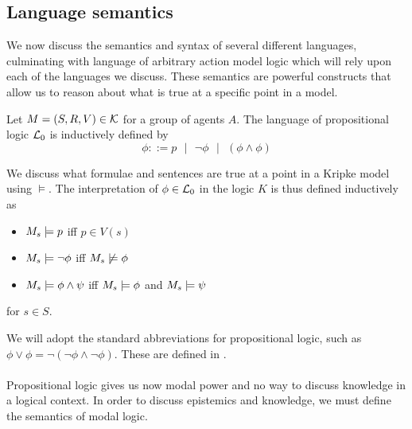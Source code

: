 \subsection{Language semantics}
We now discuss the semantics and syntax of several different languages, culminating with language of
arbitrary action model logic which will rely upon each of the languages we discuss.
These semantics are powerful constructs that allow us to reason about what is true at a specific
point in a model.

\begin{defn} \label{propLogic}
Let $M = (S, R, V) \in \mathcal{K}$ for a group of agents $A$.
The language of propositional logic $\mathcal{L}_0$ is inductively defined by
\[
	\phi ::= p \text{ } | \text{ } \neg \phi \text{ } | \text{ } (\phi \land \phi)
\]

We discuss what formulae and sentences are true at a point in a Kripke model using $\models$.
The interpretation of $\phi \in \mathcal{L}_0$ in the logic $K$ is thus defined inductively as

\begin{itemize}
	\item $M_s \models p$ iff $p \in V(s)$
	\item $M_s \models \neg \phi$ iff $M_s \not \models \phi$
	\item $M_s \models \phi \land \psi$ iff $M_s \models \phi$ and $M_s \models \psi$
\end{itemize}

for $s \in S$.
\end{defn}

We will adopt the standard abbreviations for propositional logic, such as $\phi \lor \phi =
\neg(\neg \phi \land \neg \phi)$.
These are defined in \cite{blackburn2002modal}.\\
\\
Propositional logic gives us now modal power and no way to discuss knowledge in a logical context.
In order to discuss epistemics and knowledge, we must define the semantics of modal logic.

